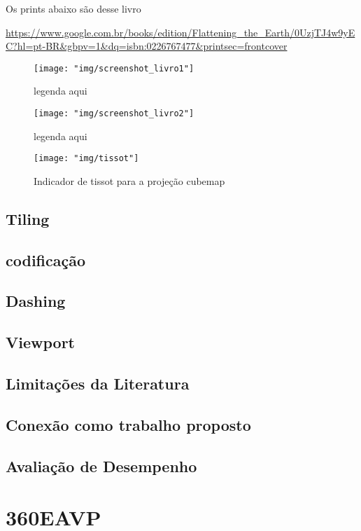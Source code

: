 Os prints abaixo são desse livro

\url{https://www.google.com.br/books/edition/Flattening_the_Earth/0UzjTJ4w9yEC?hl=pt-BR&gbpv=1&dq=isbn:0226767477&printsec=frontcover}

\begin{figure}[tbh]
	\centering
	\texttt{[image: "img/screenshot\_livro1"]}
	\caption{legenda aqui}
	\label{fig:screenshot_livro1}
\end{figure}

\begin{figure}[tbh]
	\centering
	\texttt{[image: "img/screenshot\_livro2"]}
	\caption{legenda aqui}
	\label{fig:screenshot_livro2}
\end{figure}

\begin{figure}[tbh]
	\centering
	\texttt{[image: "img/tissot"]}
	\caption{Indicador de tissot para a projeção cubemap}
	\label{fig:tissot}
\end{figure}



\subsection{Tiling}
\subsection{codificação}
\subsection{Dashing}
\subsection{Viewport}
\subsection{Limitações da Literatura}
\subsection{Conexão como trabalho proposto}
\subsection{Avaliação de Desempenho}


\section{360EAVP}
